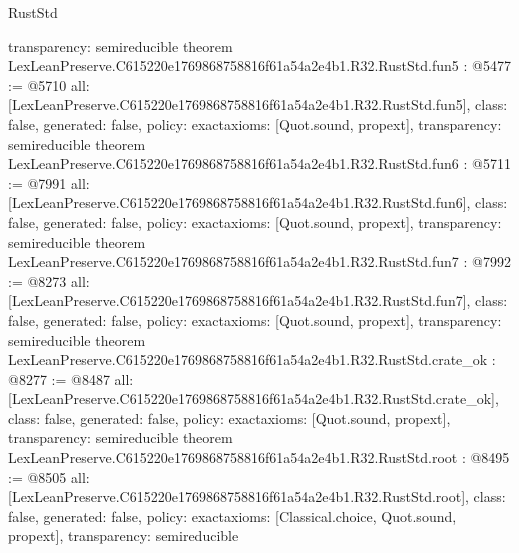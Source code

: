 \begin{lexlean}{RustStd}
\begin{coremodule}
{  transparency: semireducible
}
theorem LexLeanPreserve.C615220e1769868758816f61a54a2e4b1.R32.RustStd.fun5 : @5477 := @5710 {
  all: [LexLeanPreserve.C615220e1769868758816f61a54a2e4b1.R32.RustStd.fun5],
  class: false,
  generated: false,
  policy: exact{axioms: [Quot.sound, propext]},
  transparency: semireducible
}
theorem LexLeanPreserve.C615220e1769868758816f61a54a2e4b1.R32.RustStd.fun6 : @5711 := @7991 {
  all: [LexLeanPreserve.C615220e1769868758816f61a54a2e4b1.R32.RustStd.fun6],
  class: false,
  generated: false,
  policy: exact{axioms: [Quot.sound, propext]},
  transparency: semireducible
}
theorem LexLeanPreserve.C615220e1769868758816f61a54a2e4b1.R32.RustStd.fun7 : @7992 := @8273 {
  all: [LexLeanPreserve.C615220e1769868758816f61a54a2e4b1.R32.RustStd.fun7],
  class: false,
  generated: false,
  policy: exact{axioms: [Quot.sound, propext]},
  transparency: semireducible
}
theorem LexLeanPreserve.C615220e1769868758816f61a54a2e4b1.R32.RustStd.crate_ok : @8277 := @8487 {
  all: [LexLeanPreserve.C615220e1769868758816f61a54a2e4b1.R32.RustStd.crate_ok],
  class: false,
  generated: false,
  policy: exact{axioms: [Quot.sound, propext]},
  transparency: semireducible
}
theorem LexLeanPreserve.C615220e1769868758816f61a54a2e4b1.R32.RustStd.root : @8495 := @8505 {
  all: [LexLeanPreserve.C615220e1769868758816f61a54a2e4b1.R32.RustStd.root],
  class: false,
  generated: false,
  policy: exact{axioms: [Classical.choice, Quot.sound, propext]},
  transparency: semireducible
}


\end{coremodule}
\end{lexlean}
